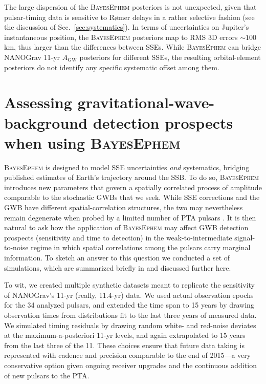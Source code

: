 \documentclass[iop,apj,twocolappendix]{emulateapj}
\begin{document}
The large dispersion of the \textsc{BayesEphem} posteriors is not unexpected, given that pulsar-timing data is sensitive to R{\o}mer delays in a rather selective fashion (see the discussion of Sec.\ \ref{sec:systematics}).
In terms of uncertainties on Jupiter's instantaneous position, the \textsc{BayesEphem} posteriors map to RMS 3D errors $\sim 100$ km, thus larger than the differences between SSEs. While \textsc{BayesEphem} can bridge NANOGrav 11-yr $A_\mathrm{GW}$ posteriors for different SSEs, the resulting orbital-element posteriors %
do not identify any specific systematic offset among them.

\section{Assessing gravitational-wave-background detection prospects when using \textsc{BayesEphem}}
\label{sec:simulations}

\textsc{BayesEphem} is designed to model SSE uncertainties \emph{and} systematics, bridging published estimates of Earth's trajectory around the SSB.
To do so, \textsc{BayesEphem} introduces new parameters that govern a spatially correlated process of amplitude comparable to the stochastic GWBs that we seek.
While SSE corrections and the GWB have different spatial-correlation structures, the two may nevertheless remain degenerate when probed by a limited number of PTA pulsars \citep{2019ApJ...876...55R}.
It is then natural to ask how the application of \textsc{BayesEphem} may affect GWB detection prospects (sensitivity and time to detection) in the weak-to-intermediate signal-to-noise regime in which spatial correlations among the pulsars carry marginal information.
To sketch an answer to this question we conducted a set of simulations, which are summarized briefly in \cite{2018ApJ...859...47A} and discussed further here.

To wit, we created multiple synthetic datasets meant to replicate the sensitivity of NANOGrav's 11-yr (really, 11.4-yr) data. We used actual observation epochs for the 34 analyzed pulsars, and extended the time span to 15 years by drawing observation times from distributions fit to the last three years of measured data.
We simulated timing residuals by drawing random white- and red-noise deviates at the maximum-a-posteriori 11-yr levels, and again extrapolated to 15 years from the last three of the 11.
These choices ensure that future data taking is represented with cadence and precision comparable to the end of 2015---a very conservative option given ongoing receiver upgrades and the continuous addition of new pulsars to the PTA.
\end{document}
